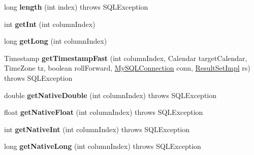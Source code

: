 \begin{DoxyCompactItemize}
long {\bfseries length} (int index)  throws S\+Q\+L\+Exception 
\item 
\mbox{\label{classcom_1_1mysql_1_1jdbc_1_1_byte_array_row_ad9a24f0f1fbfdcb06caa92b939f211cf}} 
int {\bfseries get\+Int} (int column\+Index)
\item 
\mbox{\label{classcom_1_1mysql_1_1jdbc_1_1_byte_array_row_a11fefa88516e47577ec458ce6d8f53f3}} 
long {\bfseries get\+Long} (int column\+Index)
\item 
\mbox{\label{classcom_1_1mysql_1_1jdbc_1_1_byte_array_row_a825ae8bf3af772dec79ab4346d309220}} 
Timestamp {\bfseries get\+Timestamp\+Fast} (int column\+Index, Calendar target\+Calendar, Time\+Zone tz, boolean roll\+Forward, \mbox{\hyperlink{interfacecom_1_1mysql_1_1jdbc_1_1_my_s_q_l_connection}{My\+S\+Q\+L\+Connection}} conn, \mbox{\hyperlink{classcom_1_1mysql_1_1jdbc_1_1_result_set_impl}{Result\+Set\+Impl}} rs)  throws S\+Q\+L\+Exception 
\item 
\mbox{\label{classcom_1_1mysql_1_1jdbc_1_1_byte_array_row_ad7a3c0af323346c331300375a310ec39}} 
double {\bfseries get\+Native\+Double} (int column\+Index)  throws S\+Q\+L\+Exception 
\item 
\mbox{\label{classcom_1_1mysql_1_1jdbc_1_1_byte_array_row_ad8c575edf91ff972f89a19f269ff9e14}} 
float {\bfseries get\+Native\+Float} (int column\+Index)  throws S\+Q\+L\+Exception 
\item 
\mbox{\label{classcom_1_1mysql_1_1jdbc_1_1_byte_array_row_a381ca6c57d0985646046318ce3b2d727}} 
int {\bfseries get\+Native\+Int} (int column\+Index)  throws S\+Q\+L\+Exception 
\item 
\mbox{\label{classcom_1_1mysql_1_1jdbc_1_1_byte_array_row_abf25101a02b0a0a9a693b30c4a0a8e7e}} 
long {\bfseries get\+Native\+Long} (int column\+Index)  throws S\+Q\+L\+Exception 
\item 
\mbox{\label{classcom_1_1mysql_1_1jdbc_1_1_byte_array_row_aeba648a24195e64f38d7ffee50c2522b}} 

\end{DoxyCompactItemize}
